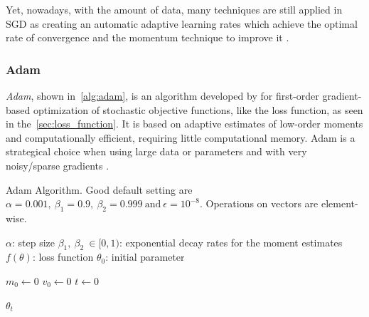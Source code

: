 Yet, nowadays, with the amount of data, many techniques are still applied in SGD as creating an automatic adaptive learning rates which achieve the optimal rate of convergence \cite{darken1991} and the momentum technique to improve it \cite{sutskever2013}.

\subsubsection*{Adam}

\emph{Adam}, shown in~\cref{alg:adam}, is an algorithm developed by \textcite{kingma2017} for first-order gradient-based optimization of stochastic objective functions, like the loss function, as seen in the~\cref{sec:loss_function}.
It is based on adaptive estimates of low-order moments and computationally efficient, requiring little computational memory.
Adam is a strategical choice when using large data or parameters and with very noisy/sparse gradients \cite{kingma2017}. 

\begin{algorithm}[!htb]
\caption[Adam Algorithm]{Adam Algorithm. Good default setting are \(\alpha = 0.001,\ \beta_1 = 0.9,\ \beta_2 = 0.999\ \text{and}\ \epsilon = 10^{-8}\). Operations on vectors are element-wise.}
\begin{algorithmic}\footnotesize
\Require \(\alpha\): step size
\Require \(\beta_1,\ \beta_2\ \in [0,1)\): exponential decay rates for the moment estimates
\Require \(f(\theta)\): loss function
\Require \(\theta_0\): initial parameter

\State \(m_0 \gets 0\)
\State \(v_0 \gets 0\)
\State \(t \gets 0\)
\EndWhile

\Return \(\theta_t\)
\end{algorithmic}
\label{alg:adam}
\end{algorithm}
